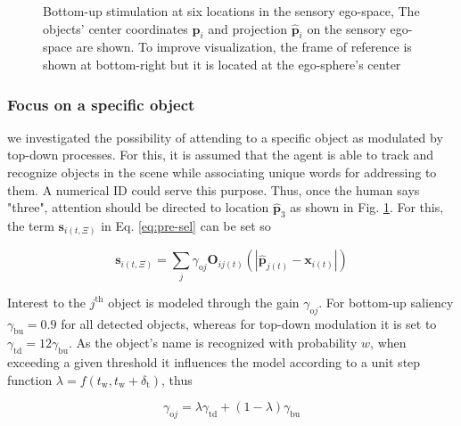 \documentclass[letterpaper, 10 pt, conference]{ieeeconf}  %
\begin{document}
\begin{figure}[h!]
\begin{center}
			\caption{Bottom-up stimulation at six locations in the sensory ego-space, The objects' center coordinates $\mathbf{p}_i$ and projection $\mathbf{\hat{p}}_i$ on the sensory ego-space are shown. To improve visualization, the frame of reference is shown at bottom-right but it is located at the ego-sphere's center}
			\label{fig:sim_objs}
			\end{center}
		\end{figure}
				
	\subsubsection{Focus on a specific object}
	
	we investigated the possibility of attending to a specific object as modulated by top-down processes. For this, it is assumed that the agent is able to track and recognize objects in the scene while associating unique words for addressing to them. A numerical ID could serve this purpose. Thus, once the human says "three", attention should be directed to location $\mathbf{\hat{p}}_3$ as shown in Fig. \ref{fig:sim_objs}. For this, the term $\mathbf{s}_{i(t,\Xi)}$ in Eq. \eqref{eq:pre-sel} can be set so
	
	\begin{equation}
	\mathbf{s}_{i(t,\Xi)} = \sum_{j}^{} \gamma_{\mathrm{o}j}\mathbf{O}_{ij(t)}\left(|\mathbf{\hat{p}}_{j(t)} - \mathbf{x}_{i(t)}|\right)
	\label{eq:sim1}
	\end{equation}
	
	Interest to the $j^{\mathrm{th}}$ object is modeled through the gain $\gamma_{\mathrm{o}j}$. For bottom-up saliency  $\gamma_\mathrm{bu} = 0.9$ for all detected objects, whereas for top-down modulation it is set to $\gamma_\mathrm{td} = 12\gamma_\mathrm{bu}$. As the object's name is recognized with probability $w$, when exceeding a given threshold it influences the model according to a unit step function $\lambda = f(t_\mathrm{w}, t_\mathrm{w}+\delta_\mathrm{t})$, thus
	
	 \begin{equation}
	 \gamma_{\mathrm{o}j} = \lambda\gamma_\mathrm{td}+ (1-\lambda)\gamma_\mathrm{bu}
	 \label{eq:sim1-step}
	 \end{equation}
	
\end{document}

